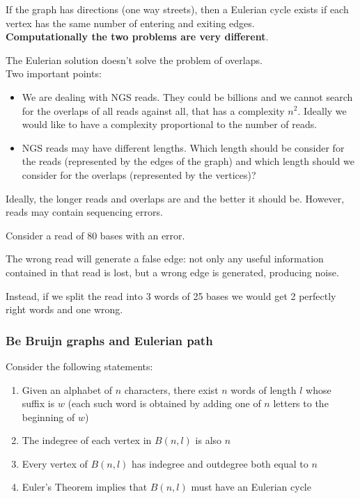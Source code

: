 If the graph has directions (one way streets), then a Eulerian
cycle exists if each vertex has the same number of entering and exiting edges. \\

\textbf{Computationally the two problems are very different}.

The Eulerian solution doesn't solve the problem of overlaps.\\

Two important points:

\begin{itemize}
	\item We are dealing with NGS reads. They could be billions and we cannot
search for the overlaps of all reads against all, that has a complexity
$n^2$. Ideally we would like to have a complexity proportional to the number
of reads.
	\item NGS reads may have different lengths. Which length should be
consider for the reads (represented by the edges of the graph) and
which length should we consider for the overlaps (represented by the vertices)?
\end{itemize}

Ideally, the longer reads and overlaps are and the better it should be.
However, reads may contain sequencing errors.

Consider a read of 80 bases with an error. 

The wrong read will generate a false edge: not only any useful information
contained in that read is lost, but a wrong edge is generated, producing noise.

Instead, if we split the read into 3 words of 25 bases we would get 2
perfectly right words and one wrong.

\subsubsection{Be Bruijn graphs and Eulerian path}

Consider the following statements:

\begin{enumerate}
	\item Given an alphabet of $n$ characters, there exist $n$ words of
length $l$ whose suffix is $w$ (each such word is obtained by adding one of
$n$ letters to the beginning of $w$)
	\item The indegree of each vertex in $B(n,l)$ is also $n$
	\item Every vertex of $B(n,l)$ has indegree and outdegree both equal to $n$
	\item Euler's Theorem implies that $B(n,l)$ must have an Eulerian cycle
\end{enumerate}

